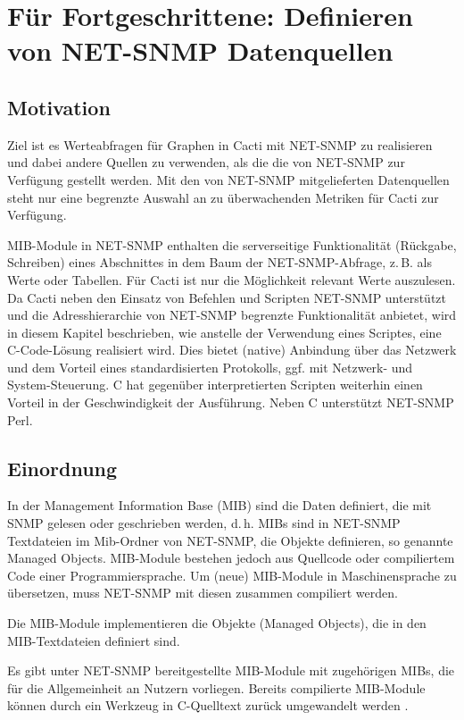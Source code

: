 \documentclass[12pt,ngerman,toc=listofnumbered,toc=bibliographynumbered,toc=index,headsepline=true]{scrbook}
\begin{document}
\chapter{Für Fortgeschrittene: Definieren von NET-SNMP Datenquellen}
\label{sec:MIB}
\section{Motivation}
Ziel ist es Werteabfragen für Graphen in Cacti mit NET-SNMP zu realisieren
und dabei andere Quellen zu verwenden, als die die von NET-SNMP zur Verfügung
gestellt werden. Mit den von NET-SNMP mitgelieferten Datenquellen steht nur
eine begrenzte Auswahl an zu überwachenden Metriken für Cacti zur Verfügung.

MIB-Module in NET-SNMP enthalten die serverseitige Funktionalität (Rückgabe,
Schreiben) eines Abschnittes in dem Baum der NET-SNMP-Abfrage, z.\,B. als Werte
oder Tabellen. Für Cacti ist nur die Möglichkeit relevant Werte auszulesen. Da
Cacti neben den Einsatz von Befehlen und Scripten NET-SNMP unterstützt und die
Adresshierarchie von NET-SNMP begrenzte Funktionalität anbietet, wird in diesem
Kapitel beschrieben, wie anstelle der Verwendung eines Scriptes, eine
C-Code-Lösung realisiert wird. Dies bietet (native) Anbindung über das Netzwerk
und dem Vorteil eines standardisierten Protokolls, ggf. mit Netzwerk- und
System-Steuerung. C hat gegenüber interpretierten Scripten weiterhin einen
Vorteil in der Geschwindigkeit der Ausführung. Neben C unterstützt NET-SNMP
Perl.

\section{Einordnung}
In der Management Information Base (MIB) sind die Daten definiert, die mit SNMP
gelesen oder geschrieben werden, d.\,h. MIBs sind in NET-SNMP Textdateien im
Mib-Ordner von NET-SNMP, die Objekte definieren, so genannte Managed Objects.
MIB-Module bestehen jedoch aus Quellcode oder compiliertem Code einer
Programmiersprache. Um (neue) MIB-Module in Maschinensprache zu übersetzen, muss
NET-SNMP mit diesen zusammen compiliert werden.

Die MIB-Module implementieren die Objekte (Managed Objects), die in den
MIB-Textdateien definiert sind.

Es gibt unter NET-SNMP bereitgestellte MIB-Module mit zugehörigen MIBs, die für
die Allgemeinheit an Nutzern vorliegen. Bereits compilierte MIB-Module können
durch ein Werkzeug in C-Quelltext zurück umgewandelt werden \cite{NetSNMP11}.
\end{document}
